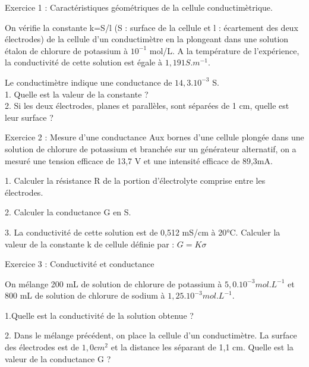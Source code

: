 \documentclass[12pt, french]{article}
\begin{document}
\begin{center}
\end{center}


   \begin{Box2}{Exercice 1 : Caractéristiques géométriques de la cellule conductimètrique.}
  
On vérifie la constante k=S/l (S : surface de la cellule et l : écartement des deux électrodes) de la
      cellule d’un conductimètre en la plongeant dans une solution étalon de chlorure de potassium à $10^{ -1}$ mol/L. A la température de l’expérience, la conductivité de cette solution est égale à $1,191 S.m^{-1}$. 

Le conductimètre indique une conductance de $14,3.10^{-3}$ S.
\\1. Quelle est la valeur de la constante ?
\\2. Si les deux électrodes, planes et parallèles, sont séparées de 1 cm, quelle est leur surface ?

   \end{Box2}


\begin{Box2}{Exercice 2 : Mesure d’une conductance }
   Aux bornes d’une cellule plongée dans une solution de chlorure de potassium et branchée sur un
générateur alternatif, on a mesuré une tension efficace de 13,7 V et une intensité efficace de 89,3mA.

1. Calculer la résistance R de la portion d’électrolyte comprise entre les électrodes.

2. Calculer la conductance G en S.

3. La conductivité de cette solution est de 0,512 mS/cm à 20°C. Calculer la valeur de la constante k de
cellule définie par : $G=K\sigma$

\end{Box2}

\begin{Box2}{Exercice 3 : Conductivité et conductance }

 On mélange 200 mL de solution de chlorure de potassium à $5,0.10^{-3} mol.L^{-1}$ et 800 mL de solution de chlorure de sodium à $1,25.10^{-3} mol.L^{-1}$. 

   1.Quelle est la conductivité de la solution obtenue ?
   
   2. Dans le mélange précédent, on place la cellule d’un conductimètre. La surface des électrodes est de
$1,0 cm^2$ et la distance les séparant de 1,1 cm. Quelle est la valeur de la conductance G ?

\end{Box2}
\end{document}
